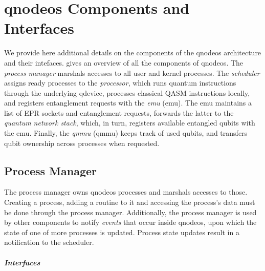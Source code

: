 \chapter{\acrshort{qnodeos} Components and Interfaces} \label{app:qnodeos}

We provide here additional details on the components of the \acrshort{qnodeos} architecture and
their intefaces.  gives an overview of all the components of
\acrshort{qnodeos}. The \emph{process manager} marshals accesses to all user and kernel processes.
The \emph{scheduler} assigns ready processes to the \emph{processor}, which runs quantum
instructions through the underlying \acrshort{qdevice}, processes classical QASM instructions
locally, and registers entanglement requests with the \emph{\acrlong{emu}} (\acrshort{emu}). The
\acrshort{emu} maintains a list of EPR sockets and entanglement requests, forwards the latter to the
\emph{quantum network stack}, which, in turn, registers available entangled qubits with the
\acrshort{emu}. Finally, the \emph{\acrlong{qmmu}} (\acrshort{qmmu}) keeps track of used qubits, and
transfers qubit ownership across processes when requested.

\section{Process Manager}

The process manager owns \acrshort{qnodeos} processes and marshals accesses to those. Creating a
process, adding a routine to it and accessing the process's data must be done through the process
manager. Additionally, the process manager is used by other components to notify \emph{events} that
occur inside \acrshort{qnodeos}, upon which the state of one of more processes is updated. Process
state updates result in a notification to the scheduler.

\paragraph{Interfaces}

